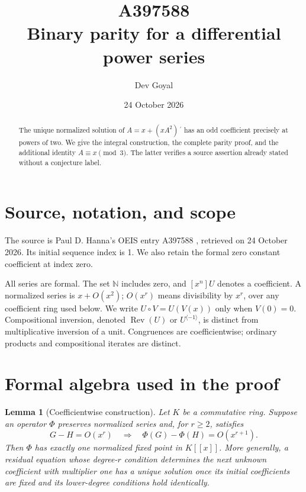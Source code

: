 \documentclass[11pt,a4paper]{article}
\title{A397588\\[4pt]\large Binary parity for a differential power series}
\author{Dev Goyal}
\date{24 October 2026}
\newtheorem{lemma}[theorem]{Lemma}
\theoremstyle{remark}
\newcommand{\N}{\mathbb N}
\newcommand{\ps}[1]{#1[[x]]}
\newcommand{\Rev}{\operatorname{Rev}}
\newcommand{\rev}{^{\langle-1\rangle}}
\begin{document}
\maketitle
\begin{center}
\end{center}
\begin{abstract}
The unique normalized solution of $A=x+(xA^2)\!\,{}^{\prime}$ has an odd coefficient precisely at powers of two. We give the integral construction, the complete parity proof, and the additional identity $A\equiv x\pmod3$. The latter verifies a source assertion already stated without a conjecture label.
\end{abstract}

\section{Source, notation, and scope}

The source is Paul D. Hanna's OEIS entry A397588 \cite{oeis588},
retrieved on 24 October 2026. Its initial sequence index is 1.
We also retain the formal zero constant coefficient at index zero.

All series are formal. The set $\N$ includes zero, and $[x^n]U$ denotes a
coefficient. A normalized series is $x+O(x^2)$; $O(x^r)$ means divisibility
by $x^r$, over any coefficient ring used below. We write $U\circ V=U(V(x))$
only when $V(0)=0$. Compositional inversion, denoted $\Rev(U)$ or $U\rev$,
is distinct from multiplicative inversion of a unit. Congruences are
coefficientwise; ordinary products and compositional iterates are distinct.

\section{Formal algebra used in the proof}

\begin{lemma}[Coefficientwise construction]\label{lem:contraction}
Let $K$ be a commutative ring. Suppose an operator $\Phi$ preserves
normalized series and, for $r\ge2$, satisfies
\[
 G-H=O(x^r)\quad\Longrightarrow\quad
 \Phi(G)-\Phi(H)=O(x^{r+1}).
\]
Then $\Phi$ has exactly one normalized fixed point in $\ps K$.
More generally, a residual equation whose degree-$r$ condition determines
the next unknown coefficient with multiplier one has a unique solution
once its initial coefficients are fixed and its lower-degree conditions
hold identically.
\end{lemma}
\end{document}
